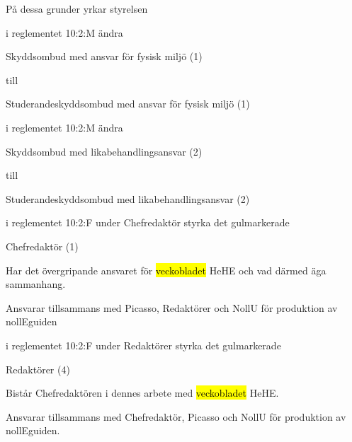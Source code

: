 \documentclass[../_main/handlingar.tex]{subfiles}
\begin{document}
\newpage

På dessa grunder yrkar styrelsen
\begin{attsatser}
    
    \att i reglementet 10:2:M ändra 
        \begin{emptylist}
            \item Skyddsombud med ansvar för fysisk miljö (1)
         \end{emptylist}
    
        till 
    
        \begin{emptylist}
            \item Studerandeskyddsombud med ansvar för fysisk miljö (1)
        \end{emptylist}

    \att i reglementet 10:2:M ändra 
        \begin{emptylist}
            \item Skyddsombud med likabehandlingsansvar (2)
         \end{emptylist}
    
        till 
    
        \begin{emptylist}
            \item Studerandeskyddsombud med likabehandlingsansvar (2)
        \end{emptylist}
    
        
    \att i reglementet 10:2:F under Chefredaktör styrka det gulmarkerade
        \begin{emptylist}
            \item Chefredaktör (1)
            \begin{dashlist}
                \item Har det övergripande ansvaret för \hl{veckobladet} HeHE och vad därmed äga sammanhang. 
                \item Ansvarar tillsammans med Picasso, Redaktörer och NollU för produktion av nollEguiden
            \end{dashlist}
        \end{emptylist}
   

   \att i reglementet 10:2:F under Redaktörer styrka det gulmarkerade
        \begin{emptylist}
            \item Redaktörer (4) 
            \begin{dashlist}
                \item Bistår Chefredaktören i dennes arbete med \hl{veckobladet} HeHE. 
                \item Ansvarar tillsammans med Chefredaktör, Picasso och NollU för produktion av nollEguiden.
            \end{dashlist}
        \end{emptylist}



\end{attsatser}
\end{document}
